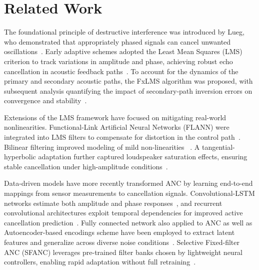 \documentclass{article}
\begin{document}
\section{Related Work}
The foundational principle of destructive interference was introduced by Lueg, who demonstrated that appropriately phased signals can cancel unwanted oscillations~\citep{lueg1936process}. Early adaptive schemes adopted the Least Mean Squares (LMS) criterion to track variations in amplitude and phase, achieving robust echo cancellation in acoustic feedback paths~\cite{burgess1981active, nelson1991active, fuller1996active, hansen1997active, kuo1999active}. To account for the dynamics of the primary and secondary acoustic paths, the FxLMS algorithm was proposed, with subsequent analysis quantifying the impact of secondary-path inversion errors on convergence and stability~\cite{boucher1991effect}.

Extensions of the LMS framework have focused on mitigating real-world nonlinearities. Functional-Link Artificial Neural Networks (FLANN) were integrated into LMS filters to compensate for distortion in the control path~\cite{patra1999identification}. Bilinear filtering improved modeling of mild non-linearities ~\cite{kuo2005nonlinear}. A tangential-hyperbolic adaptation further captured loudspeaker saturation effects, ensuring stable cancellation under high-amplitude conditions~\cite{ghasemi2016nonlinear}.

Data-driven models have more recently transformed ANC by learning end-to-end mappings from sensor measurements to cancellation signals. Convolutional-LSTM networks estimate both amplitude and phase responses~\cite{zhang2021deep}, and recurrent convolutional architectures exploit temporal dependencies for improved active cancellation prediction~\cite{park2023had, mostafavi2023deep, cha2023dnoisenet}. Fully connected network also applied to ANC \cite{pike2023generalized} as well as Autoencoder-based encodings scheme have been employed to extract latent features and generalize across diverse noise conditions~\cite{singh2024enhancing}. Selective Fixed-filter ANC (SFANC) leverages pre-trained filter banks chosen by lightweight neural controllers, enabling rapid adaptation without full retraining~\cite{shi2020feedforward, shi2022selective, shi2023transferable, luo2022hybrid, park2023integrated}. 
\end{document}
